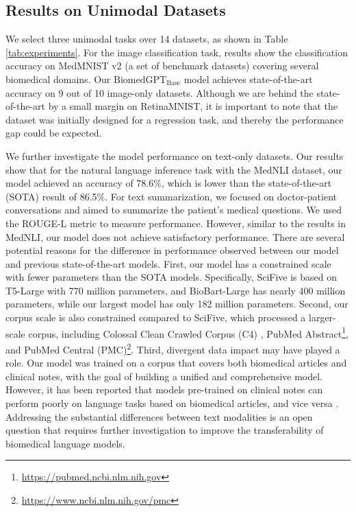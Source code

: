 \documentclass[10pt]{article} \usepackage[preprint]{tmlr}
\begin{document}
\subsection{Results on Unimodal Datasets}
We select three unimodal tasks over 14 datasets, as shown in Table \ref{tab:experiments}. For the image classification task, results show the classification accuracy on MedMNIST v2 \cite{medmnistv2} (a set of benchmark datasets) covering several biomedical domains. Our $\text{BiomedGPT}_{\text{Base}}$ model achieves state-of-the-art accuracy on 9 out of 10 image-only datasets. Although we are behind the state-of-the-art by a small margin on RetinaMNIST, it is important to note that the dataset was initially designed for a regression task, and thereby the  performance gap could be expected.

We further investigate the model performance on text-only datasets. Our results show that for the natural language inference task with the MedNLI dataset, our model achieved an accuracy of 78.6\%, which is lower than the state-of-the-art (SOTA) result of 86.5\%. For text summarization, we focused on doctor-patient conversations and aimed to summarize the patient's medical questions. We used the ROUGE-L metric to measure performance. However, similar to the results in MedNLI, our model does not achieve satisfactory performance. There are several potential reasons for the difference in performance observed between our model and previous state-of-the-art models. First, our model has a constrained scale with fewer parameters than the SOTA models. Specifically, SciFive is based on T5-Large \citep{raffel2020exploring} with 770 million parameters, and BioBart-Large has nearly 400 million parameters, while our largest model has only 182 million parameters. Second, our corpus scale is also constrained compared to SciFive, which processed a larger-scale corpus, including Colossal Clean Crawled Corpus (C4) \citep{raffel2020exploring}, PubMed Abstract\footnote{\url{https://pubmed.ncbi.nlm.nih.gov}}, and PubMed Central (PMC)\footnote{\url{https://www.ncbi.nlm.nih.gov/pmc}}. Third, divergent data impact may have played a role. Our model was trained on a corpus that covers both biomedical articles and clinical notes, with the goal of building a unified and comprehensive model. However, it has been reported that models pre-trained on clinical notes can perform poorly on language tasks based on biomedical articles, and vice versa \citep{gu2021domain, alsentzer-etal-2019-publicly, lehman2023we}. Addressing the substantial differences between text modalities is an open question that requires further investigation to improve the transferability of biomedical language models.
\end{document}

